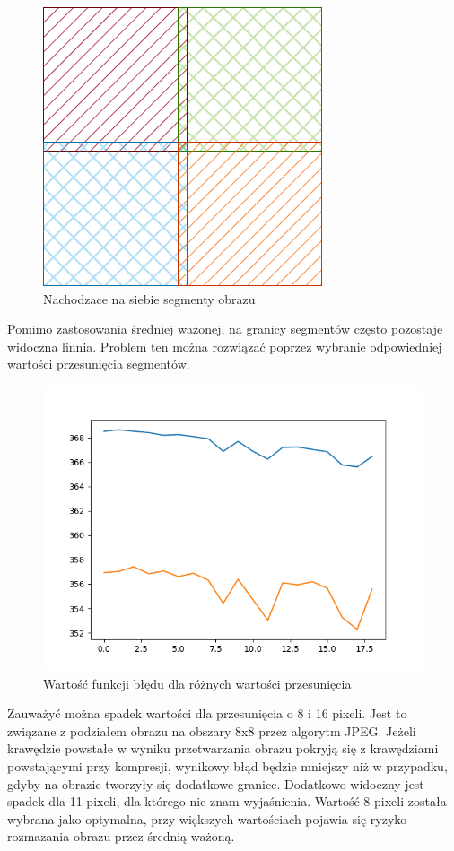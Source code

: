 \documentclass[a4paper,11pt]{article}
\begin{document}
\begin{figure}[h!]
\begin{center}
	\includegraphics[width=0.5\columnwidth]{overlap.png}
	\caption{Nachodzace na siebie segmenty obrazu}
\end{center}
\end{figure}

Pomimo zastosowania średniej ważonej, na granicy segmentów często pozostaje widoczna linnia.
Problem ten można rozwiązać poprzez wybranie odpowiedniej wartości przesunięcia segmentów.
\begin{figure}[h!]
\begin{center}
	\includegraphics[width=0.7\columnwidth]{overlap_and_loss.png}
	\caption{Wartość funkcji błędu dla różnych wartości przesunięcia}
\end{center}
\end{figure}
Zauważyć można spadek wartości dla przesunięcia o 8 i 16 pixeli. Jest to związane z podziałem obrazu na obszary 8x8 przez algorytm JPEG.
Jeżeli krawędzie powstałe w wyniku przetwarzania obrazu pokryją się z krawędziami powstającymi przy kompresji,
wynikowy błąd będzie mniejszy niż w przypadku, gdyby na obrazie tworzyły się dodatkowe granice.
Dodatkowo widoczny jest spadek dla 11 pixeli, dla którego nie znam wyjaśnienia.
Wartość 8 pixeli została wybrana jako optymalna, przy większych wartościach pojawia się ryzyko rozmazania obrazu przez średnią ważoną.
\end{document}
